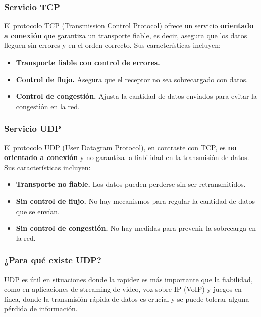 \documentclass[a4paper,12pt]{article}
\begin{document}
\subsubsection{Servicio TCP}

El protocolo TCP (Transmission Control Protocol) ofrece un servicio \textbf{orientado a conexión} que garantiza un transporte fiable, es decir, asegura que los datos lleguen sin errores y en el orden correcto. Sus características incluyen:

\begin{itemize}
    \item \textbf{Transporte fiable con control de errores.}
    \item \textbf{Control de flujo.} Asegura que el receptor no sea sobrecargado con datos.
    \item \textbf{Control de congestión.} Ajusta la cantidad de datos enviados para evitar la congestión en la red.
\end{itemize}

\subsubsection{Servicio UDP}

El protocolo UDP (User Datagram Protocol), en contraste con TCP, es \textbf{no orientado a conexión} y no garantiza la fiabilidad en la transmisión de datos. Sus características incluyen:

\begin{itemize}
    \item \textbf{Transporte no fiable.} Los datos pueden perderse sin ser retransmitidos.
    \item \textbf{Sin control de flujo.} No hay mecanismos para regular la cantidad de datos que se envían.
    \item \textbf{Sin control de congestión.} No hay medidas para prevenir la sobrecarga en la red.
\end{itemize}

\subsubsection{¿Para qué existe UDP?}

UDP es útil en situaciones donde la rapidez es más importante que la fiabilidad, como en aplicaciones de streaming de video, voz sobre IP (VoIP) y juegos en línea, donde la transmisión rápida de datos es crucial y se puede tolerar alguna pérdida de información.
\end{document}
